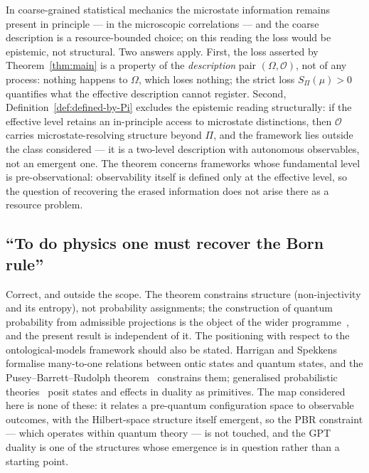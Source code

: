 \documentclass[12pt,a4paper]{article}
\begin{document}
    In coarse-grained statistical mechanics the microstate information remains present in principle --- in the
    microscopic correlations --- and the coarse description is a resource-bounded choice; on this reading the
    loss would be epistemic, not structural.
    Two answers apply.
    First, the loss asserted by Theorem~\ref{thm:main} is a property of the \emph{description} pair
    $(\Omega, \mathcal{O})$, not of any process: nothing happens to $\Omega$, which loses nothing; the strict
    loss $S_\Pi(\mu) > 0$ quantifies what the effective description cannot register.
    Second, Definition~\ref{def:defined-by-Pi} excludes the epistemic reading structurally: if the effective
    level retains an in-principle access to microstate distinctions, then $\mathcal{O}$ carries
    microstate-resolving structure beyond $\Pi$, and the framework lies outside the class considered --- it is a
    two-level description with autonomous observables, not an emergent one.
    The theorem concerns frameworks whose fundamental level is pre-observational: observability itself is
    defined only at the effective level, so the question of recovering the erased information does not arise
    there as a resource problem.

  \subsection*{``To do physics one must recover the Born rule''}

    Correct, and outside the scope.
    The theorem constrains structure (non-injectivity and its entropy), not probability assignments; the
    construction of quantum probability from admissible projections is the object of the wider
    programme~\citep{Cosmochrony, Beau2026b}, and the present result is independent of it.
    The positioning with respect to the ontological-models framework should also be stated.
    Harrigan and Spekkens~\citep{HarriganSpekkens2010} formalise many-to-one relations between ontic states and
    quantum states, and the Pusey--Barrett--Rudolph theorem~\citep{PBR2012} constrains them; generalised
    probabilistic theories~\citep{Barrett2007} posit states and effects in duality as primitives.
    The map considered here is none of these: it relates a pre-quantum configuration space to observable
    outcomes, with the Hilbert-space structure itself emergent, so the PBR constraint --- which operates within
    quantum theory --- is not touched, and the GPT duality is one of the structures whose emergence is in
    question rather than a starting point.
\end{document}
